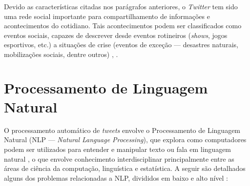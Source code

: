 \documentclass[
	12pt,				%
	oneside,			%
	a4paper,			%
	english,			%
	brazil				%
	]{abntex2ppgsi}
\begin{document}
Devido as características citadas nos parágrafos anteriores, o \textit{Twitter} tem sido uma rede social importante para compartilhamento de informações e acontecimentos do cotidiano. Tais acontecimentos podem ser classificados como eventos sociais, capazes de descrever desde eventos rotineiros (\textit{shows}, jogos esportivos, etc.) a situações de crise (eventos de exceção --- desastres naturais, mobilizações sociais, dentre outros) \cite{zhou2014event}, \cite{atefeh2015survey}.



\section{Processamento de Linguagem Natural}
\label{nlp}

O processamento automático de \textit{tweets} envolve o Processamento de Linguagem Natural (NLP --- \textit{Natural Language Processing}), que explora como computadores podem ser utilizados para entender e manipular texto ou fala em linguagem natural \cite{liu2017roadmap}, o que envolve conhecimento interdisciplinar principalmente entre as áreas de ciência da computação, linguística e estatística. A seguir são detalhados alguns dos problemas relacionadas a NLP, divididos em baixo e alto nível \cite{nadkarni2011natural}:
\end{document}
